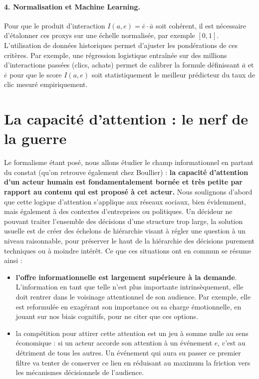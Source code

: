 \documentclass[11pt]{article}
\begin{document}
			\paragraph{4. Normalisation et Machine Learning.}
			Pour que le produit d'interaction $I(a,e) = \bar{e} \cdot \bar{a}$ soit cohérent, il est nécessaire d'étalonner ces proxys sur une échelle normalisée, par exemple $[0, 1]$. L'utilisation de données historiques permet d'ajuster les pondérations de ces critères. Par exemple, une régression logistique entraînée sur des millions d'interactions passées (clics, achats) permet de calibrer la formule définissant $\bar{a}$ et $\bar{e}$ pour que le score $I(a,e)$ soit statistiquement le meilleur prédicteur du taux de clic mesuré empiriquement.
	
	
	\section{La capacité d'attention : le nerf de la guerre}
	
		Le formalisme étant posé, nous allons étudier le champ informationnel en partant du constat (qu'on retrouve également chez Boullier) : \textbf{la capacité d'attention d'un acteur humain est fondamentalement bornée et très petite par rapport au contenu qui est proposé à cet acteur.} Nous soulignons d'abord que cette logique d'attention s'applique aux réseaux sociaux, bien évidemment, mais également à des contextes d'entreprises ou politiques. Un décideur ne pouvant traiter l'ensemble des décisions d'une structure trop large, la solution usuelle est de créer des échelons de hiérarchie visant à régler une question à un niveau raisonnable, pour préserver le haut de la hiérarchie des décisions purement techniques ou à moindre intérêt. Ce que ces situations ont en commun se résume ainsi : 
		\begin{itemize}
			\item \textbf{l'offre informationnelle est largement supérieure à la demande}. L'information en tant que telle n'est plus importante intrinsèquement, elle doit rentrer dans le voisinage attentionnel de son audience. Par exemple, elle est reformulée en exagérant son importance ou sa charge émotionnelle, en jouant sur nos biais cognitifs, pour ne citer que ces options. 
			\item la compétition pour attirer cette attention est un jeu à somme nulle au sens économique : si un acteur accorde son attention à un événement $e$, c'est au détriment de tous les autres. Un événement qui aura su passer ce premier filtre va tenter de conserver ce lien en réduisant au maximum la friction vers les mécanismes décisionnels de l'audience. 
		\end{itemize}
		
\end{document}

